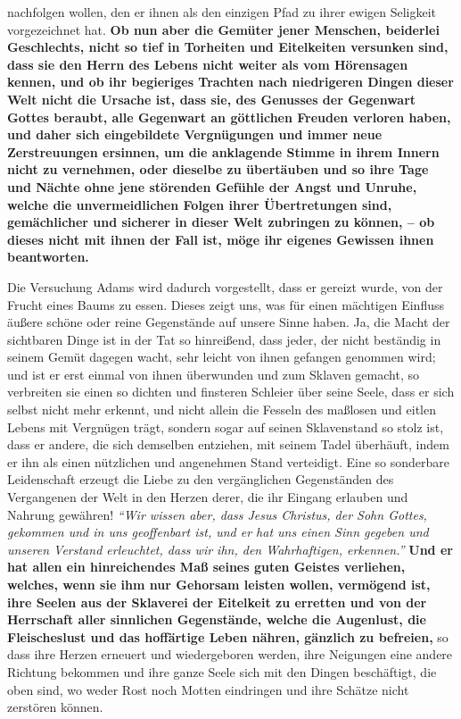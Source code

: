 nachfolgen wollen, den er ihnen
als den einzigen Pfad zu ihrer ewigen Seligkeit vorgezeichnet hat. \textbf{Ob
nun aber
die Gemüter jener Menschen, beiderlei Geschlechts, nicht so tief in Torheiten
und
Eitelkeiten versunken sind, dass sie den Herrn des Lebens nicht weiter als vom
Hörensagen kennen, und ob ihr begieriges Trachten nach niedrigeren Dingen dieser
Welt nicht die Ursache ist, dass sie, des Genusses der Gegenwart Gottes
beraubt,
alle Gegenwart an göttlichen Freuden verloren haben, und daher sich
eingebildete Vergnügungen und immer neue Zerstreuungen ersinnen, um die
anklagende Stimme in ihrem Innern nicht zu vernehmen, oder dieselbe zu
übertäuben und so ihre Tage und Nächte ohne jene störenden Gefühle der Angst
und Unruhe, welche die unvermeidlichen Folgen ihrer Übertretungen sind,
gemächlicher und sicherer in dieser Welt zubringen zu können, -- ob dieses nicht
mit ihnen der Fall ist, möge ihr eigenes Gewissen ihnen
beantworten.}

\medskip

Die Versuchung Adams wird dadurch vorgestellt, dass er gereizt wurde, von der
Frucht eines Baums zu essen.
Dieses zeigt uns, was für
einen mächtigen Einfluss äußere schöne oder reine Gegenstände auf unsere Sinne
haben. Ja, die Macht der sichtbaren Dinge ist in der Tat so hinreißend, dass
jeder, der nicht beständig in seinem Gemüt dagegen wacht, sehr leicht von
ihnen gefangen genommen wird; und ist er erst einmal von ihnen überwunden und
zum Sklaven gemacht, so verbreiten sie einen so dichten
und finsteren Schleier
über seine Seele, dass er sich selbst nicht mehr erkennt, und nicht allein die
Fesseln des maßlosen und
eitlen Lebens mit
Vergnügen trägt, sondern sogar auf
seinen Sklavenstand so stolz ist, dass er andere, die sich
demselben entziehen,
mit seinem Tadel überhäuft, indem er ihn als einen nützlichen und angenehmen
Stand verteidigt. Eine so sonderbare Leidenschaft erzeugt die Liebe zu den
vergänglichen Gegenständen des Vergangenen der Welt in den Herzen derer, die ihr
Eingang erlauben und
Nahrung gewähren!
\textit{"`Wir wissen aber, dass Jesus Christus,
der Sohn Gottes, gekommen und in uns geoffenbart ist, und er hat uns einen Sinn
gegeben und unseren Verstand erleuchtet, dass wir ihn, den Wahrhaftigen,
erkennen."'}
\textbf{Und er hat allen ein hinreichendes Maß seines
guten Geistes verliehen, welches, wenn sie ihm nur Gehorsam leisten wollen,
vermögend ist, ihre Seelen aus der Sklaverei der Eitelkeit zu erretten und von
der Herrschaft aller sinnlichen Gegenstände, welche die Augenlust, die
Fleischeslust und das hoffärtige Leben nähren, gänzlich zu befreien,} so dass
ihre
Herzen erneuert und wiedergeboren werden, ihre Neigungen
eine andere Richtung
bekommen und ihre ganze Seele sich mit den Dingen beschäftigt, die oben sind,
wo weder Rost noch Motten eindringen und ihre Schätze nicht zerstören können.


